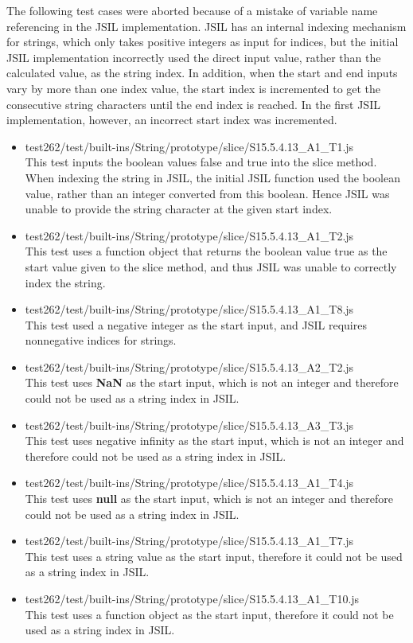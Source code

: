 \documentclass[a4paper,11pt,twoside]{report}
\begin{document}
\begin{itemize}
The following test cases were aborted because of a mistake of variable name referencing in the JSIL implementation. JSIL has an internal indexing mechanism for strings, which only takes positive integers as input for indices, but the initial JSIL implementation incorrectly used the direct input value, rather than the calculated value, as the string index. In addition, when the start and end inputs vary by more than one index value, the start index is incremented to get the consecutive string characters until the end index is reached. In the first JSIL implementation, however, an incorrect start index was incremented.
\begin{itemize}
\item test262/test/built-ins/String/prototype/slice/S15.5.4.13\_A1\_T1.js \\
This test inputs the boolean values false and true into the slice method. When indexing the string in JSIL, the initial JSIL function used the boolean value, rather than an integer converted from this boolean. Hence JSIL was unable to provide the string character at the given start index.
\item test262/test/built-ins/String/prototype/slice/S15.5.4.13\_A1\_T2.js \\
This test uses a function object that returns the boolean value true as the start value given to the slice method, and thus JSIL was unable to correctly index the string.
\item test262/test/built-ins/String/prototype/slice/S15.5.4.13\_A1\_T8.js \\
This test used a negative integer as the start input, and JSIL requires nonnegative indices for strings.
\item test262/test/built-ins/String/prototype/slice/S15.5.4.13\_A2\_T2.js \\
This test uses \textbf{NaN} as the start input, which is not an integer and therefore could not be used as a string index in JSIL.
\item test262/test/built-ins/String/prototype/slice/S15.5.4.13\_A3\_T3.js \\
This test uses negative infinity as the start input, which is not an integer and therefore could not be used as a string index in JSIL.
\item test262/test/built-ins/String/prototype/slice/S15.5.4.13\_A1\_T4.js \\
This test uses \textbf{null} as the start input, which is not an integer and therefore could not be used as a string index in JSIL.
\item test262/test/built-ins/String/prototype/slice/S15.5.4.13\_A1\_T7.js \\
This test uses a string value as the start input, therefore it could not be used as a string index in JSIL.
\item test262/test/built-ins/String/prototype/slice/S15.5.4.13\_A1\_T10.js \\
This test uses a function object as the start input, therefore it could not be used as a string index in JSIL.
\end{itemize}


\end{itemize}
\end{document}
